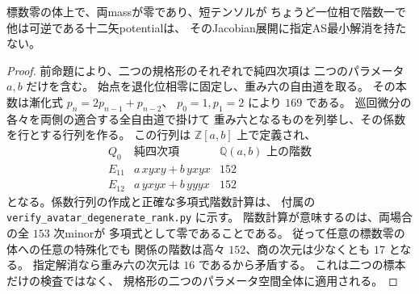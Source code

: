\begin{corollary}[一退化位相は指定AS解消を持たない]
\label{cor:qa-avatar-one-degenerate-as-excluded}
標数零の体上で、両massが零であり、短テンソルが
ちょうど一位相で階数一で他は可逆である十二矢potentialは、
そのJacobian展開に指定AS最小解消を持たない。
\end{corollary}
\begin{proof}
前命題により、二つの規格形のそれぞれで純四次項は
二つのパラメータ $a,b$ だけを含む。
始点を退化位相零に固定し、重み六の自由道を取る。
その本数は漸化式 $p_n=2p_{n-1}+p_{n-2}$、
$p_0=1,p_1=2$ により $169$ である。
巡回微分の各々を両側の適合する全自由道で掛けて
重み六となるものを列挙し、その係数を行とする行列を作る。
この行列は $\mathbb Z[a,b]$ 上で定義され、
\[
 \begin{array}{c|c|c}
 Q_0&\text{純四次項}&\text{$\mathbb Q(a,b)$ 上の階数}\\\hline
 E_{11}&a\,xyxy+b\,yxyx&152\\
 E_{12}&a\,yxyx+b\,yyyx&152
 \end{array}
\]
となる。係数行列の作成と正確な多項式階数計算は、
付属の \texttt{verify\_avatar\_degenerate\_rank.py} に示す。
階数計算が意味するのは、両場合の全 $153$ 次minorが
多項式として零であることである。
従って任意の標数零の体への任意の特殊化でも
関係の階数は高々 $152$、商の次元は少なくとも $17$ となる。
指定解消なら重み六の次元は $16$ であるから矛盾する。
これは二つの標本だけの検査ではなく、
規格形の二つのパラメータ空間全体に適用される。
\end{proof}

